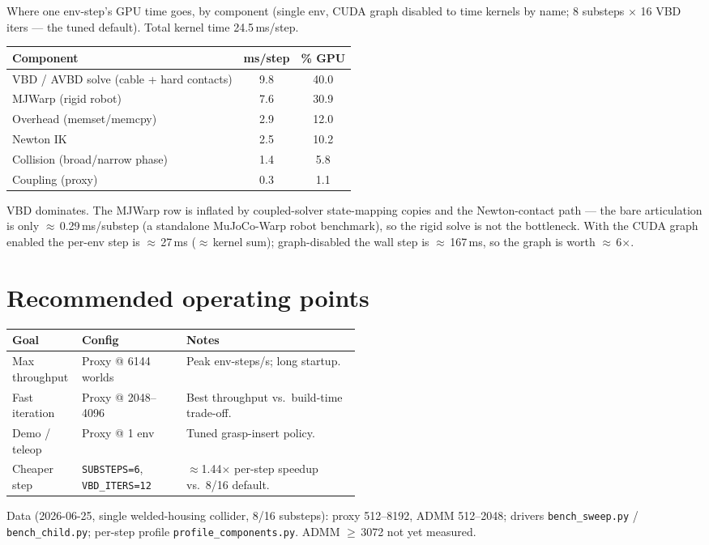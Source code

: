 \documentclass[a4paper,11pt]{article}
\newcommand{\tableheading}[1]{{\color{ReportMuted}#1\par\vspace{0.35em}}}
\newcommand{\ReportCaption}[1]{{\small\color{ReportMuted} #1\par}}
\newenvironment{reporttable}{%
  \vspace{0.35em}\begin{center}\small
  \renewcommand{\arraystretch}{1.3}\setlength{\tabcolsep}{10pt}%
}{%
  \end{center}\vspace{0.55em}%
}
\begin{document}
\tableheading{Where one env-step's GPU time goes, by component (single env, CUDA graph disabled to time
kernels by name; 8 substeps $\times$ 16 VBD iters --- the tuned default). Total kernel time 24.5\,ms/step.}
\begin{reporttable}
\begin{tabular}{@{}l S[table-format=2.1] S[table-format=2.1]@{}}
\toprule
\textbf{Component} & {\textbf{ms/step}} & {\textbf{\% GPU}} \\
\midrule
VBD / AVBD solve (cable + hard contacts) &  9.8 & 40.0 \\
MJWarp (rigid robot)                     &  7.6 & 30.9 \\
Overhead (memset/memcpy)                 &  2.9 & 12.0 \\
Newton IK                                &  2.5 & 10.2 \\
Collision (broad/narrow phase)           &  1.4 &  5.8 \\
Coupling (proxy)                         &  0.3 &  1.1 \\
\bottomrule
\end{tabular}
\end{reporttable}
\ReportCaption{VBD dominates. The MJWarp row is inflated by coupled-solver state-mapping copies and the
Newton-contact path --- the bare articulation is only $\approx$\,0.29\,ms/substep (a standalone
MuJoCo-Warp robot benchmark), so the rigid solve is not the bottleneck. With the CUDA graph enabled the
per-env step is $\approx$\,27\,ms ($\approx$\,kernel sum); graph-disabled the wall step is
$\approx$\,167\,ms, so the graph is worth $\approx$\,6$\times$.}

\section{Recommended operating points}

\begin{reporttable}
\setlength{\tabcolsep}{6pt}%
\begin{tabularx}{\linewidth}{@{}>{\raggedright\arraybackslash}p{0.20\linewidth}
  >{\raggedright\arraybackslash}p{0.30\linewidth} X@{}}
\toprule
\textbf{Goal} & \textbf{Config} & \textbf{Notes} \\
\midrule
Max throughput   & Proxy @ 6144 worlds & Peak env-steps/s; long startup. \\
Fast iteration   & Proxy @ 2048--4096  & Best throughput vs.\ build-time trade-off. \\
Demo / teleop    & Proxy @ 1 env       & Tuned grasp-insert policy. \\
Cheaper step     & \texttt{SUBSTEPS=6}, \texttt{VBD\_ITERS=12} & $\approx$1.44$\times$ per-step speedup vs.\ 8/16 default. \\
\bottomrule
\end{tabularx}
\end{reporttable}

\vspace{0.6em}
{\small\color{ReportMuted}%
Data (2026-06-25, single welded-housing collider, 8/16 substeps): proxy 512--8192, ADMM 512--2048;
drivers \texttt{bench\_sweep.py} / \texttt{bench\_child.py}; per-step profile
\texttt{profile\_components.py}. ADMM $\ge$\,3072 not yet measured.}
\end{document}
